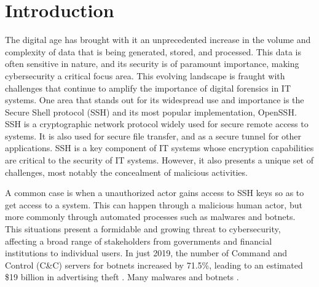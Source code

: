 \chapter{Introduction}\label{chap:introduction}



The digital age has brought with it an unprecedented increase in the volume and complexity of data that is being generated, stored, and processed. This data is often sensitive in nature, and its security is of paramount importance, making cybersecurity a critical focus area. This evolving landscape is fraught with challenges that continue to amplify the importance of digital forensics in IT systems. One area that stands out for its widespread use and importance is the Secure Shell protocol (SSH) and its most popular implementation, OpenSSH. SSH is a cryptographic network protocol widely used for secure remote access to systems. It is also used for secure file transfer, and as a secure tunnel for other applications. SSH is a key component of IT systems whose encryption capabilities are critical to the security of IT systems. However, it also presents a unique set of challenges, most notably the concealment of malicious activities.

A common case is when a unauthorized actor gains access to SSH keys so as to get access to a system. This can happen through a malicious human actor, but more commonly through automated processes such as malwares and botnets. This situations present a formidable and growing threat to cybersecurity, affecting a broad range of stakeholders from governments and financial institutions to individual users. In just 2019, the number of Command and Control (C\&C) servers for botnets increased by 71.5\%, leading to an estimated \$19 billion in advertising theft \cite{SSHBotnetInfect21}. Many malwares and botnets  \cite{SSHBotnetInfect21}. 

